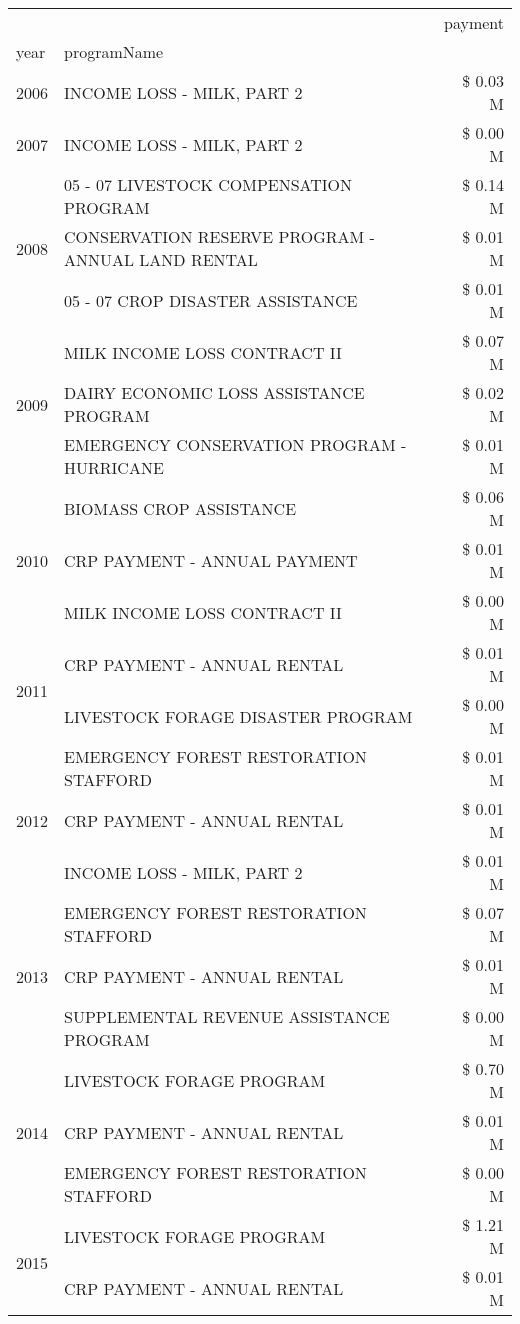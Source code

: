 \begin{tabular}{llr}
\toprule
 &  & payment \\
year & programName &  \\
\midrule
2006 & INCOME LOSS - MILK, PART 2 & \$ 0.03 M \\
\cline{1-3}
2007 & INCOME LOSS - MILK, PART 2 & \$ 0.00 M \\
\cline{1-3}
\multirow[t]{3}{*}{2008} & 05 - 07 LIVESTOCK COMPENSATION PROGRAM & \$ 0.14 M \\
 & CONSERVATION RESERVE PROGRAM - ANNUAL LAND RENTAL & \$ 0.01 M \\
 & 05 - 07 CROP DISASTER ASSISTANCE & \$ 0.01 M \\
\cline{1-3}
\multirow[t]{3}{*}{2009} & MILK INCOME LOSS CONTRACT II & \$ 0.07 M \\
 & DAIRY ECONOMIC LOSS ASSISTANCE PROGRAM & \$ 0.02 M \\
 & EMERGENCY CONSERVATION PROGRAM - HURRICANE & \$ 0.01 M \\
\cline{1-3}
\multirow[t]{3}{*}{2010} & BIOMASS CROP ASSISTANCE & \$ 0.06 M \\
 & CRP PAYMENT - ANNUAL PAYMENT & \$ 0.01 M \\
 & MILK INCOME LOSS CONTRACT II & \$ 0.00 M \\
\cline{1-3}
\multirow[t]{2}{*}{2011} & CRP PAYMENT - ANNUAL RENTAL & \$ 0.01 M \\
 & LIVESTOCK FORAGE DISASTER PROGRAM & \$ 0.00 M \\
\cline{1-3}
\multirow[t]{3}{*}{2012} & EMERGENCY FOREST RESTORATION STAFFORD & \$ 0.01 M \\
 & CRP PAYMENT - ANNUAL RENTAL & \$ 0.01 M \\
 & INCOME LOSS - MILK, PART 2 & \$ 0.01 M \\
\cline{1-3}
\multirow[t]{3}{*}{2013} & EMERGENCY FOREST RESTORATION STAFFORD & \$ 0.07 M \\
 & CRP PAYMENT - ANNUAL RENTAL & \$ 0.01 M \\
 & SUPPLEMENTAL REVENUE ASSISTANCE PROGRAM & \$ 0.00 M \\
\cline{1-3}
\multirow[t]{3}{*}{2014} & LIVESTOCK FORAGE PROGRAM & \$ 0.70 M \\
 & CRP PAYMENT - ANNUAL RENTAL & \$ 0.01 M \\
 & EMERGENCY FOREST RESTORATION STAFFORD & \$ 0.00 M \\
\cline{1-3}
\multirow[t]{2}{*}{2015} & LIVESTOCK FORAGE PROGRAM & \$ 1.21 M \\
 & CRP PAYMENT - ANNUAL RENTAL & \$ 0.01 M \\

\end{tabular}
